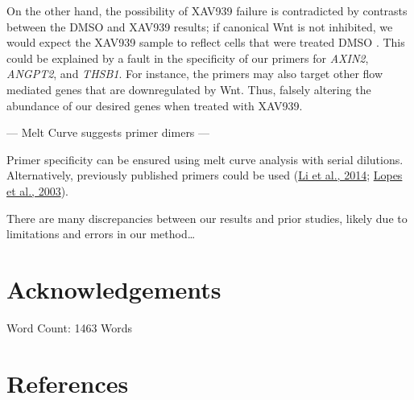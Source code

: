 \documentclass[
  11pt,
]{article}
\begin{document}
On the other hand, the possibility of XAV939 failure is contradicted by contrasts between the DMSO and XAV939 results; if canonical Wnt is not inhibited, we would expect the XAV939 sample to reflect cells that were treated DMSO .
This could be explained by a fault in the specificity of our primers for \emph{AXIN2}, \emph{ANGPT2}, and \emph{THSB1}.
For instance, the primers may also target other flow mediated genes that are downregulated by Wnt.
Thus, falsely altering the abundance of our desired genes when treated with XAV939.

--- Melt Curve suggests primer dimers ---

Primer specificity can be ensured using melt curve analysis with serial dilutions.
Alternatively, previously published primers could be used (\protect\hyperlink{ref-Li2014-mx}{Li et al., 2014}; \protect\hyperlink{ref-lopes2003}{Lopes et al., 2003}).

There are many discrepancies between our results and prior studies, likely due to limitations and errors in our method\ldots{}

\hypertarget{acknowledgements}{%
\section{Acknowledgements}\label{acknowledgements}}

\begin{flushright}
Word Count: 1463 Words
\end{flushright}

\hypertarget{references}{%
\section{References}\label{references}}

\small
\end{document}
